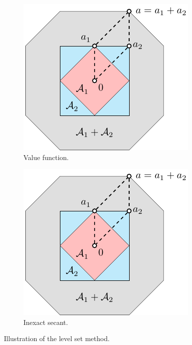 \begin{figure}[t] \label{fig:value_fn}
    \begin{subfigure}{.48\textwidth}
      \centering
      \includegraphics[width=\linewidth, page=8]{./figures/illustrations2}
      \captionsetup{justification=centering}
      \caption{Value function.}
    \end{subfigure}
    \hfill
    \begin{subfigure}{.48\textwidth}
      \centering
      \includegraphics[width=\linewidth, page=9]{./figures/illustrations2}
      \captionsetup{justification=centering}
      \caption{Inexact secant.}
    \end{subfigure}
    \captionsetup{justification=centering}
    \caption{Illustration of the level set method.}
\end{figure}

